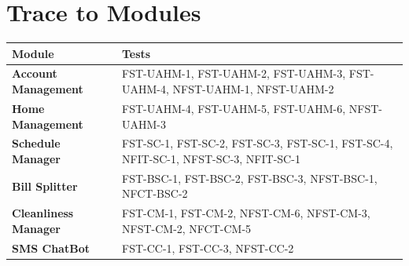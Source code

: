 \documentclass[12pt, titlepage]{article}
\begin{document}
\section{Trace to Modules}
\renewcommand{\arraystretch}{1.5}
\begin{center}
  \begin{tabular}{|p{5cm}|p{10cm}|}
    \hline
    \textbf{Module} & \textbf{Tests} \\
    \hline
    \textbf{Account Management} &  FST-UAHM-1, FST-UAHM-2, FST-UAHM-3, FST-UAHM-4, NFST-UAHM-1, NFST-UAHM-2\\ 
    \hline
    \textbf{Home Management} & FST-UAHM-4, FST-UAHM-5, FST-UAHM-6, NFST-UAHM-3\\ 
    \hline
    \textbf{Schedule Manager} &  FST-SC-1, FST-SC-2, FST-SC-3, FST-SC-1, FST-SC-4, NFIT-SC-1, NFST-SC-3, NFIT-SC-1 \\ 
    \hline
    \textbf{Bill Splitter} & FST-BSC-1, FST-BSC-2, FST-BSC-3, NFST-BSC-1, NFCT-BSC-2 \\ 
    \hline
    \textbf{Cleanliness Manager} & FST-CM-1, FST-CM-2, NFST-CM-6, NFST-CM-3, NFST-CM-2, NFCT-CM-5\\    
    \hline
    \textbf{SMS ChatBot} & FST-CC-1, FST-CC-3, NFST-CC-2\\ 
    \hline
  \end{tabular}
\end{center}
\end{document}
